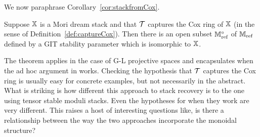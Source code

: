 \documentclass[12pt]{amsart}
\begin{document}

We now paraphrase Corollary~\ref{cor:stackfromCox}.
\begin{theorem}  \label{thm:3}
Suppose $\mathbb{X}$ is a Mori dream stack and that $\mathcal{T}$ captures the Cox ring of $\mathbb{X}$ (in the sense of Definition~\ref{def:captureCox}). 
Then there is an open subset $\mathbb{M}_{\textup{ref}}^\circ$ of $\mathbb{M}_{\textup{ref}}$ defined by a GIT stability parameter which is isomorphic to $\mathbb{X}$.
\end{theorem}
The theorem applies in the case of G-L projective spaces and encapsulates when the ad hoc argument in \cite{AU} works. Checking the hypothesis that $\mathcal{T}$ captures the Cox ring is usually easy for concrete examples, but not necessarily in the abstract. What is striking is how different this approach to stack recovery is to the one using tensor stable moduli stacks. Even the hypotheses for when they work are very different. This raises a host of interesting questions like, is there a relationship between the way the two approaches incorporate the monoidal structure?
\end{document}
